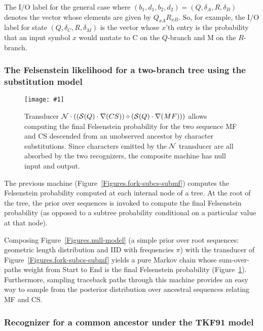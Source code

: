 \documentclass{article}
\newcommand{\figref}[1]{Figure~\ref{Figures.#1}}
\newcommand{\figlabel}[1]{\label{Figures.#1}}
\newcommand{\easyfig}[4]{
\begin{figure}
\texttt{[image: \#1]}
\caption{ \figlabel{#3} #4}
\end{figure}}
\newcommand{\pdffig}[2]{\easyfig{#1-fig.pdf}{}{#1}{#2}}
\newcommand\nullmodel{{\cal N}}
\newcommand\substitute{{\cal S}}
\newcommand\fork{\circ}
\newcommand\recognize{\nabla}
\begin{document}
The I/O label for the general case where $(b_1,d_1,b_2,d_2) = (Q,\delta_A,R,\delta_B)$
denotes the vector whose elements are given by $Q_{xA} R_{xB}$.
So, for example,
the I/O label for state $(Q,\delta_C,R,\delta_M)$
is the vector whose $x$'th entry is the probability that an input symbol $x$
would mutate to C on the $Q$-branch and M on the $R$-branch.

\subsubsection{The Felsenstein likelihood for a two-branch tree using the substitution model}

\pdffig{root-fork-subcs-submf}{Transducer $\nullmodel \cdot ((\substitute(Q) \cdot \recognize(CS))\fork(\substitute(Q) \cdot \recognize(MF)))$ 
allows computing  the final Felsenstein probability for the two sequence MF and CS descended from an unobserved ancestor
by character substitutions.  Since characters emitted by the $\nullmodel$ transducer are
all absorbed by the two recognizers, the composite machine has null input and output.  }

The previous machine (\figref{fork-subcs-submf}) computes the Felsenstein probability computed at each internal
node of a tree.  
At the root of the tree, the prior over sequences is invoked to compute the final Felsenstein
probability (as opposed to a subtree probability conditional on a particular value at that node).

Composing \figref{null-model} (a simple prior over root sequences: geometric length distribution and IID with frequencies $\pi$)
with the transducer of \figref{fork-subcs-submf}
yields a pure Markov chain
whose sum-over-paths weight from Start to End is the final Felsenstein probability (\figref{root-fork-subcs-submf}).  
Furthermore, sampling traceback paths through this machine provides an easy
way to  sample from the  posterior distribution over ancestral sequences relating MF and CS.  

\subsubsection{Recognizer for a common ancestor under the TKF91 model}
\end{document}
